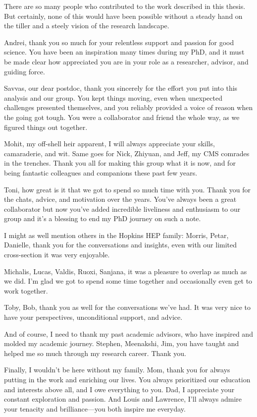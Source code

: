 

There are so many people who contributed to the work described in this thesis. But certainly, none of this would have been possible without a steady hand on the tiller and a steely vision of the research landscape. 

Andrei, thank you so much for your relentless support and passion for good science. You have been an inspiration many times during my PhD, and it must be made clear how appreciated you are in your role as a researcher, advisor, and guiding force. 

Savvas, our dear postdoc, thank you sincerely for the effort you put into this analysis and our group. You kept things moving, even when unexpected challenges presented themselves, and you reliably provided a voice of reason when the going got tough. You were a collaborator and friend the whole way, as we figured things out together. 

Mohit, my off-shell heir apparent, I will always appreciate your skills, camaraderie, and wit. Same goes for Nick, Zhiyuan, and Jeff, my CMS comrades in the trenches. Thank you all for making this group what it is now, and for being fantastic colleagues and companions these past few years. 

Toni, how great is it that we got to spend so much time with you. Thank you for the chats, advice, and motivation over the years. You've always been a great collaborator but now you've added incredible liveliness and enthusiasm to our group and it's a blessing to end my PhD journey on such a note. 

I might as well mention others in the Hopkins HEP family: Morris, Petar, Danielle, thank you for the conversations and insights, even with our limited cross-section it was very enjoyable. 

Michalis, Lucas, Valdis, Ruoxi, Sanjana, it was a pleasure to overlap as much as we did. I'm glad we got to spend some time together and occasionally even get to work together. 

Toby, Bob, thank you as well for the conversations we've had. It was very nice to have your perspectives, unconditional support, and advice. 

And of course, I need to thank my past academic advisors, who have inspired and molded my academic journey. Stephen, Meenakshi, Jim, you have taught and helped me so much through my research career. Thank you. 

Finally, I wouldn't be here without my family. Mom, thank you for always putting in the work and enriching our lives. You always prioritized our education and interests above all, and I owe everything to you. Dad, I appreciate your constant exploration and passion. And Louis and Lawrence, I'll always admire your tenacity and brilliance---you both inspire me everyday. 
